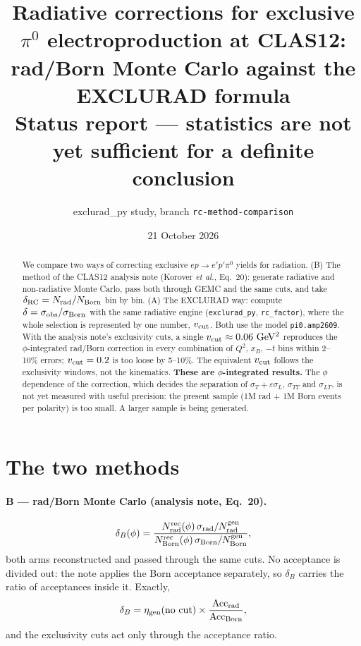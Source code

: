 \documentclass[11pt]{article}
\title{Radiative corrections for exclusive $\pi^0$ electroproduction at CLAS12:\\
rad/Born Monte Carlo against the EXCLURAD formula\\[4pt]
\large Status report --- statistics are not yet sufficient for a definite conclusion}
\author{exclurad\_py study, branch \texttt{rc-method-comparison}}
\date{21 October 2026}
\newcommand{\vcut}{v_{\rm cut}}
\begin{document}
\maketitle

\begin{abstract}
We compare two ways of correcting exclusive $ep\to e'p'\pi^0$ yields for radiation.
(B) The method of the CLAS12 analysis note (Korover \textit{et al.}, Eq.~20): generate radiative and
non-radiative Monte Carlo, pass both through GEMC and the same cuts, and take
$\delta_{\rm RC}=N_{\rm rad}/N_{\rm Born}$ bin by bin.
(A) The EXCLURAD way: compute $\delta=\sigma_{\rm obs}/\sigma_{\rm Born}$ with the same radiative
engine (\texttt{exclurad\_py}, \texttt{rc\_factor}), where the whole selection is represented by one
number, $\vcut$. Both use the model \texttt{pi0.amp2609}. With the analysis note's exclusivity cuts,
a single $\vcut\approx0.06~\mathrm{GeV^2}$ reproduces the $\phi$-integrated rad/Born correction in
every combination of $Q^2$, $x_B$, $-t$ bins within 2--10\% errors; $\vcut=0.2$ is too loose by
5--10\%. The equivalent $\vcut$ follows the exclusivity windows, not the kinematics.
\textbf{These are $\phi$-integrated results.} The $\phi$ dependence of the correction, which decides
the separation of $\sigma_T+\varepsilon\sigma_L$, $\sigma_{TT}$ and $\sigma_{LT}$, is not yet
measured with useful precision: the present sample (1M rad + 1M Born events per polarity) is too
small. A larger sample is being generated.
\end{abstract}

\tableofcontents
\newpage

\section{The two methods}

\paragraph{B --- rad/Born Monte Carlo (analysis note, Eq.~20).}
\begin{equation}
\delta_B(\phi)=\frac{N^{\rm rec}_{\rm rad}(\phi)\,\sigma_{\rm rad}/N^{\rm gen}_{\rm rad}}
{N^{\rm rec}_{\rm Born}(\phi)\,\sigma_{\rm Born}/N^{\rm gen}_{\rm Born}},
\end{equation}
both arms reconstructed and passed through the same cuts. No acceptance is divided out: the note
applies the Born acceptance separately, so $\delta_B$ carries the ratio of acceptances inside it.
Exactly,
\begin{equation}
\delta_B=\eta_{\rm gen}(\text{no cut})\times\frac{{\rm Acc}_{\rm rad}}{{\rm Acc}_{\rm Born}},
\end{equation}
and the exclusivity cuts act only through the acceptance ratio.
\end{document}
